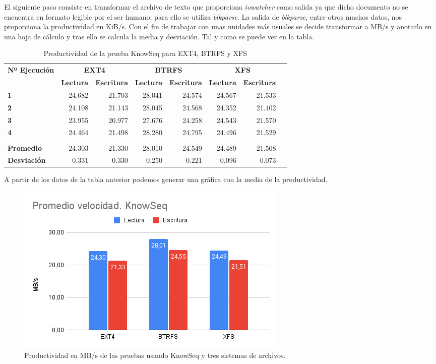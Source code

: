El siguiente paso consiste en transformar el archivo de texto que proporciona \textit{iowatcher} como salida ya que dicho documento no se encuentra en formato legible por el ser humano, para ello se utiliza \textit{blkparse}. La salida de \textit{blkparse}, entre otros muchos datos, nos proporciona la productividad en KiB/s. Con el fin de trabajar con unas unidades más usuales se decide transformar a MB/s y anotarlo en una hoja de cálculo y tras ello se calcula la media y desviación. Tal y como se puede ver en la tabla.

\begin{table}[H]\centering 
\caption{Productividad de la prueba KnowSeq para EXT4, BTRFS y XFS} 
\scriptsize
\begin{tabular}{lrrrrrrr}\toprule
\textbf{Nº Ejecución} &\multicolumn{2}{c}{\textbf{EXT4}} &\multicolumn{2}{c}{\textbf{BTRFS}} &\multicolumn{2}{c}{\textbf{XFS}} \\\cmidrule{1-7}
&\textbf{Lectura} &\textbf{Escritura} &\textbf{Lectura} &\textbf{Escritura} &\textbf{Lectura} &\textbf{Escritura} \\\midrule
\textbf{1} &24.682 &21.703 &28.041 &24.574 &24.567 &21.533 \\
\textbf{2} &24.108 &21.143 &28.045 &24.568 &24.352 &21.402 \\
\textbf{3} &23.955 &20.977 &27.676 &24.258 &24.543 &21.570 \\
\textbf{4} &24.464 &21.498 &28.280 &24.795 &24.496 &21.529 \\
\textbf{} & & & & & & \\
\textbf{Promedio} &24.303 &21.330 &28.010 &24.549 &24.489 &21.508 \\
\textbf{Desviación} &0.331 &0.330 &0.250 &0.221 &0.096 &0.073 \\
\bottomrule
\end{tabular}
\end{table}
A partir de los datos de la tabla anterior podemos generar una gráfica con la media de la productividad.

\begin{figure}[H] 
    \centering
    \includegraphics[scale=0.6]{doc/assets/images/Capitulo4/Knowseq/promknow.png}
    \caption{Productividad en MB/s de las pruebas usando KnowSeq y tres sistemas de archivos.}
    \label{aa}
\end{figure}

